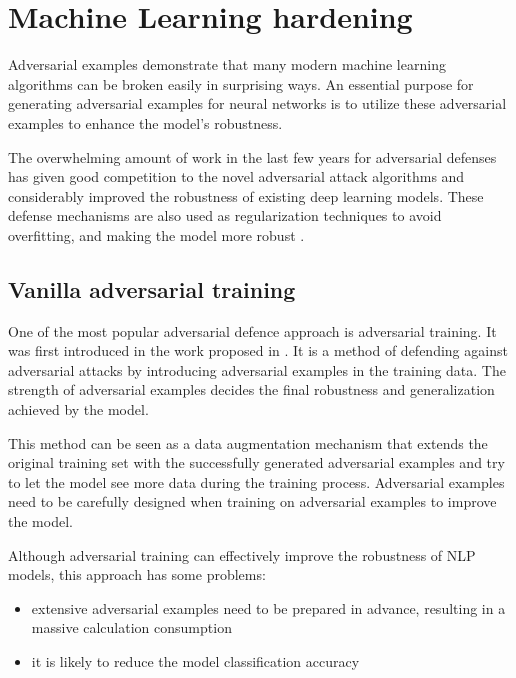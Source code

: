 \section{Machine Learning hardening}\label{sec:ml-hardening}
Adversarial examples demonstrate that many modern machine learning algorithms can be broken easily in surprising ways. 
An essential purpose for generating adversarial examples for neural networks is to utilize these adversarial examples to enhance the model's robustness.

The overwhelming amount of work in the last few years for adversarial defenses has given good competition to the novel adversarial attack algorithms and considerably improved the robustness of existing deep learning models. These defense mechanisms are also used as regularization techniques to avoid overfitting, and making the model more robust \cite{https://doi.org/10.48550/arxiv.2203.06414}.

\subsection{Vanilla adversarial training}\label{subsec:adversarial-training}
One of the most popular adversarial defence approach is adversarial training.
It was first introduced in the work proposed in \cite{goodfellow2014explaining}. 
It is a method of defending against adversarial attacks by introducing adversarial examples in the training data. 
The strength of adversarial examples decides the final robustness and generalization achieved by the model.

This method can be seen as a data augmentation mechanism that extends the original training set with the successfully generated adversarial examples and try to let the model see more data during the training process.
Adversarial examples need to be carefully designed when training on adversarial examples to improve the model.

Although adversarial training can effectively improve the robustness of NLP models, this approach has some problems: 
\begin{itemize}
    \item extensive adversarial examples need to be prepared in advance, resulting in a massive calculation consumption
    \item it is likely to reduce the model classification accuracy
\end{itemize}


